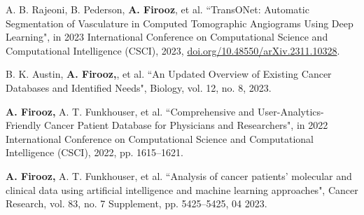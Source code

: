 


\begin{cvpublication}
\vspace{-2mm}
    \cvpub
        {\begin{cvitems}
            \item {A. B. Rajeoni, B. Pederson, \textbf{A. Firooz}, et al. “TransONet: Automatic Segmentation of Vasculature in Computed Tomographic Angiograms Using Deep Learning", in 2023 International Conference on Computational Science and Computational Intelligence (CSCI), 2023, \href{https://doi.org/10.48550/arXiv.2311.10328}{doi.org/10.48550/arXiv.2311.10328}.}
        \end{cvitems}}
    {}
    \cvpub
        {\begin{cvitems}
            \item {B. K. Austin, \textbf{A. Firooz,}, et al. “An Updated Overview of Existing Cancer Databases and Identified Needs", Biology, vol. 12, no. 8, 2023.}
        \end{cvitems}}
        {}
    \cvpub
        {\begin{cvitems}
            \item {\textbf{A. Firooz,} A. T. Funkhouser, et al. “Comprehensive and User-Analytics-Friendly Cancer Patient Database for Physicians and Researchers", in 2022 International Conference on Computational Science and Computational Intelligence (CSCI), 2022, pp. 1615–1621.}
        \end{cvitems}}
        {}
    \cvpub
        {\begin{cvitems}
            \item {\textbf{A. Firooz,} A. T. Funkhouser, et al. “Analysis of cancer patients’ molecular and clinical data using artificial intelligence and machine learning approaches", Cancer Research, vol. 83, no. 7 Supplement, pp. 5425–5425, 04 2023.}

\end{cvitems}}
\end{cvpublication}
